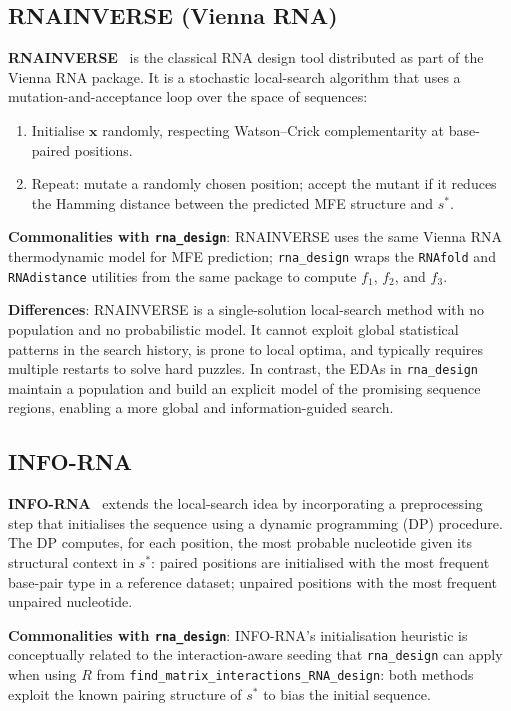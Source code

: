 \documentclass[11pt,a4paper]{article}
\begin{document}
\subsection{RNAINVERSE (Vienna RNA)}

\textbf{RNAINVERSE}~\cite{hofacker1994fast, lorenz2011viennarna} is the
classical RNA design tool distributed as part of the Vienna RNA package. It
is a stochastic local-search algorithm that uses a mutation-and-acceptance
loop over the space of sequences:
\begin{enumerate}
  \item Initialise $\mathbf{x}$ randomly, respecting Watson--Crick
    complementarity at base-paired positions.
  \item Repeat: mutate a randomly chosen position; accept the mutant if
    it reduces the Hamming distance between the predicted MFE structure
    and $s^*$.
\end{enumerate}
\textbf{Commonalities with \texttt{rna\_design}}: RNAINVERSE uses the same
Vienna RNA thermodynamic model for MFE prediction; \texttt{rna\_design}
wraps the \texttt{RNAfold} and \texttt{RNAdistance} utilities from the
same package to compute $f_1$, $f_2$, and $f_3$.

\textbf{Differences}: RNAINVERSE is a single-solution local-search method with
no population and no probabilistic model. It cannot exploit global
statistical patterns in the search history, is prone to local optima, and
typically requires multiple restarts to solve hard puzzles. In contrast, the
EDAs in \texttt{rna\_design} maintain a population and build an explicit
model of the promising sequence regions, enabling a more global and
information-guided search.

\subsection{INFO-RNA}

\textbf{INFO-RNA}~\cite{busch2006informa} extends the local-search idea by
incorporating a preprocessing step that initialises the sequence using
a dynamic programming (DP) procedure. The DP computes, for each position,
the most probable nucleotide given its structural context in $s^*$:
paired positions are initialised with the most frequent base-pair type
in a reference dataset; unpaired positions with the most frequent unpaired
nucleotide.

\textbf{Commonalities with \texttt{rna\_design}}: INFO-RNA's initialisation
heuristic is conceptually related to the interaction-aware seeding that
\texttt{rna\_design} can apply when using $R$ from
\texttt{find\_matrix\_interactions\_RNA\_design}: both methods exploit
the known pairing structure of $s^*$ to bias the initial sequence.
\end{document}
